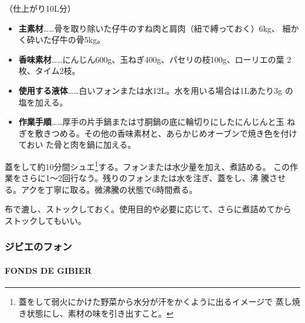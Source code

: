 \begin{recette}

（仕上がり10L分）

\begin{itemize}
\item
  \textbf{主素材}\ldots{}\ldots{}骨を取り除いた仔牛のすね肉と肩肉（紐で縛っておく）6kg、
  細かく砕いた仔牛の骨5kg。
\item
  \textbf{香味素材}\ldots{}\ldots{}にんじん600g、玉ねぎ400g、パセリの枝100g、ローリエの葉
  2枚、タイム2枝。
\item
  \textbf{使用する液体}\ldots{}\ldots{}白いフォンまたは水12L。水を用いる場合は1Lあたり3g
  の塩を加える。
\item
  \textbf{作業手順}\ldots{}\ldots{}厚手の片手鍋または寸胴鍋の底に輪切りにしたにんじんと玉
  ねぎを敷きつめる。その他の香味素材と、あらかじめオーブンで焼き色を付けておい
  た骨と肉を鍋に加える。
\end{itemize}

蓋をして約10分間シュエ\footnote{蓋をして弱火にかけた野菜から水分が汗をかくように出るイメージで
  蒸し焼き状態にし、素材の味を引き出すこと。}する。フォンまたは水少量を加え、煮詰める。
この作業をさらに1〜2回行なう。残りのフォンまたは水を注ぎ、蓋をし、沸
騰させる。アクを丁寧に取る。微沸騰の状態で6時間煮る。

布で漉し、ストックしておく。使用目的や必要に応じて、さらに煮詰めてから
ストックしてもいい。

\maeaki

\hypertarget{ux30b8ux30d3ux30a8ux306eux30d5ux30a9ux30f3}{%
\subsubsection{ジビエのフォン}\label{ux30b8ux30d3ux30a8ux306eux30d5ux30a9ux30f3}}

\hypertarget{fonds-de-gibier}{%
\paragraph{FONDS DE GIBIER}\label{fonds-de-gibier}}



\end{recette}
